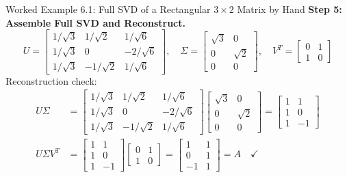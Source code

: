 \begin{examplebox}[breakable]{Worked Example 6.1: Full SVD of a Rectangular $3 \times 2$ Matrix by Hand}
\textbf{Step 5: Assemble Full SVD and Reconstruct.}
\begin{equation}
U = \begin{bmatrix} 1/\sqrt{3} & 1/\sqrt{2} & 1/\sqrt{6} \\ 1/\sqrt{3} & 0 & -2/\sqrt{6} \\ 1/\sqrt{3} & -1/\sqrt{2} & 1/\sqrt{6} \end{bmatrix}, \quad \Sigma = \begin{bmatrix} \sqrt{3} & 0 \\ 0 & \sqrt{2} \\ 0 & 0 \end{bmatrix}, \quad V^T = \begin{bmatrix} 0 & 1 \\ 1 & 0 \end{bmatrix}
\end{equation}
Reconstruction check:
\begin{align}
U \Sigma &= \begin{bmatrix} 1/\sqrt{3} & 1/\sqrt{2} & 1/\sqrt{6} \\ 1/\sqrt{3} & 0 & -2/\sqrt{6} \\ 1/\sqrt{3} & -1/\sqrt{2} & 1/\sqrt{6} \end{bmatrix} \begin{bmatrix} \sqrt{3} & 0 \\ 0 & \sqrt{2} \\ 0 & 0 \end{bmatrix} = \begin{bmatrix} 1 & 1 \\ 1 & 0 \\ 1 & -1 \end{bmatrix} \\
U \Sigma V^T &= \begin{bmatrix} 1 & 1 \\ 1 & 0 \\ 1 & -1 \end{bmatrix} \begin{bmatrix} 0 & 1 \\ 1 & 0 \end{bmatrix} = \begin{bmatrix} 1 & 1 \\ 0 & 1 \\ -1 & 1 \end{bmatrix} = A \quad \checkmark
\end{align}
\end{examplebox}

